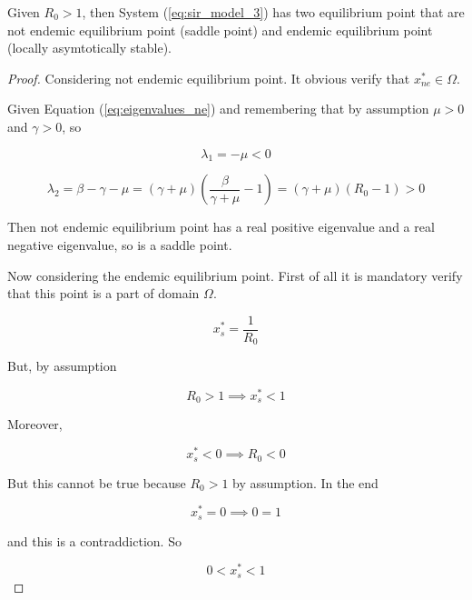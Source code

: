 \begin{theorem}
\label{th:R0_major_then_1_Equilibria}
Given $R_0 > 1$, then System (\ref{eq:sir_model_3}) has two equilibrium point that are not endemic equilibrium point (saddle point) and endemic equilibrium point (locally asymtotically stable).
\end{theorem}

\begin{proof}
Considering not endemic equilibrium point. It obvious verify that $x_{ne}^* \in \Omega$.

Given Equation (\ref{eq:eigenvalues_ne}) and remembering that by assumption $\mu > 0$ and $\gamma > 0$, so

\begin{equation}
    \lambda_1 = -\mu < 0
\end{equation}

\begin{equation}
    \lambda_2 = \beta - \gamma - \mu = (\gamma + \mu)\left(\frac{\beta}{\gamma + \mu} - 1\right) = (\gamma + \mu)(R_0 - 1) > 0
\end{equation}

Then not endemic equilibrium point has a real positive eigenvalue and a real negative eigenvalue, so is a saddle point.

Now considering the endemic equilibrium point. First of all it is mandatory verify that this point is a part of domain $\Omega$.

\begin{equation}
    x_s^* = \frac{1}{R_0}
\end{equation}

But, by assumption

\begin{equation}
    R_0 > 1 \implies x_s^* < 1
\end{equation}

Moreover, 

\begin{equation}
    x_s^* < 0 \implies R_0 < 0  
\end{equation}

But this cannot be true because $R_0 > 1$ by assumption. In the end

\begin{equation}
    x_s^* = 0 \implies 0 = 1  
\end{equation}

and this is a contraddiction. So

\begin{equation}
    0 < x_s^* < 1
\end{equation}


\end{proof}

